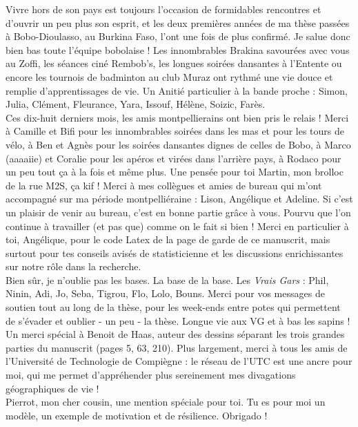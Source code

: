 \documentclass[12pt,twoside]{reedthesis}
\begin{document}
\begin{acknowledgements}
    Vivre hors de son pays est toujours l'occasion de formidables rencontres et d'ouvrir un peu plus son esprit, et les deux premières années de ma thèse passées à Bobo-Dioulasso, au Burkina Faso, l'ont une fois de plus confirmé. Je salue donc bien bas toute l'équipe bobolaise ! Les innombrables Brakina savourées avec vous au Zoffi, les séances ciné Rembob's, les longues soirées dansantes à l'Entente ou encore les tournois de badminton au club Muraz ont rythmé une vie douce et remplie d'apprentissages de vie. Un Anitié particulier à la bande proche : Simon, Julia, Clément, Fleurance, Yara, Issouf, Hélène, Soizic, Farès.\\

    Ces dix-huit derniers mois, les amis montpellierains ont bien pris le relais ! Merci à Camille et Bifi pour les innombrables soirées dans les mas et pour les tours de vélo, à Ben et Agnès pour les soirées dansantes dignes de celles de Bobo, à Marco (aaaaiie) et Coralie pour les apéros et virées dans l'arrière pays, à Rodaco pour un peu tout ça à la fois et même plus. Une pensée pour toi Martin, mon brolloc de la rue M2S, ça kif ! Merci à mes collègues et amies de bureau qui m'ont accompagné sur ma période montpelliéraine : Lison, Angélique et Adeline. Si c'est un plaisir de venir au bureau, c'est en bonne partie grâce à vous. Pourvu que l'on continue à travailler (et pas que) comme on le fait si bien ! Merci en particulier à toi, Angélique, pour le code Latex de la page de garde de ce manuscrit, mais surtout pour tes conseils avisés de statisticienne et les discussions enrichissantes sur notre rôle dans la recherche.\\

    Bien sûr, je n'oublie pas les bases. La base de la base. Les \emph{Vrais Gars} : Phil, Ninin, Adi, Jo, Seba, Tigrou, Flo, Lolo, Bouns. Merci pour vos messages de soutien tout au long de la thèse, pour les week-ends entre potes qui permettent de s'évader et oublier - un peu - la thèse. Longue vie aux VG et à bas les sapins ! Un merci spécial à Benoit de Haas, auteur des dessins séparant les trois grandes parties du manuscrit (pages 5, 63, 210). Plus largement, merci à tous les amis de l'Université de Technologie de Compiègne : le réseau de l'UTC est une ancre pour moi, qui me permet d'appréhender plus sereinement mes divagations géographiques de vie !\\

    Pierrot, mon cher cousin, une mention spéciale pour toi. Tu es pour moi un modèle, un exemple de motivation et de résilience. Obrigado !\\


\end{acknowledgements}
\end{document}
